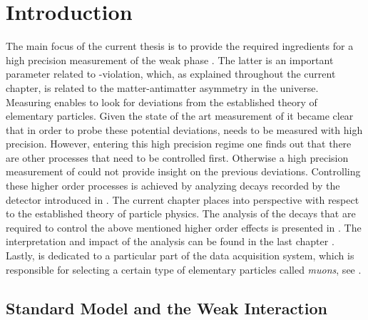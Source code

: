 
\chapter{Introduction}
\label{Introduction}

The main focus of the current thesis is to provide the required ingredients for a high precision measurement of
the weak phase \phis. The latter is an important parameter related to \CP-violation, which, as explained throughout
the current chapter, is related to the matter-antimatter asymmetry in the universe. Measuring \phis enables to look
for deviations from the established theory of elementary particles. Given the state of the art measurement of \phis \cite{phis-3fb-paper}
it became clear that in order to probe these potential deviations, \phis needs to be measured with high precision.
However, entering this high precision regime one finds out that there are other processes that need to be
controlled first. Otherwise a high precision measurement of \phis could not provide insight on the previous
deviations. Controlling these higher order processes is achieved by analyzing \BsJpsiKst decays recorded
by the \lhcb detector introduced in . The current chapter places \phis into perspective
with respect to the established theory of particle physics. The analysis of the \BsJpsiKst decays that are
required to control the above mentioned higher order effects is presented in .
The interpretation and impact of the analysis can be found in the last chapter .
Lastly,  is dedicated to a particular part of the \lhcb data acquisition system,
which is responsible for selecting a certain type of elementary particles called {\it muons}, see .

\section{Standard Model and the Weak Interaction}
\label{The_Standard_Model}


